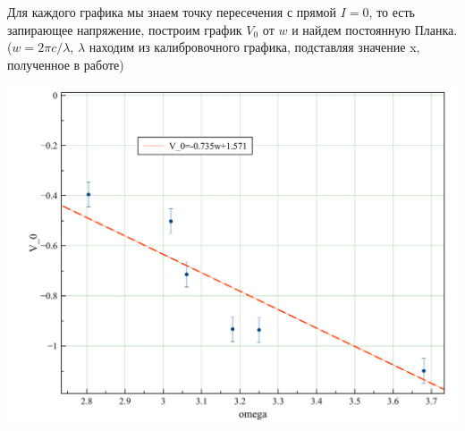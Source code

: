 \documentclass[a4paper,12pt]{article}
\begin{document}
			Для каждого графика мы знаем точку пересечения с прямой $I = 0$, то есть запирающее напряжение, построим график $V_0$ от $w$ и найдем постоянную Планка. ($w=2\pi c/\lambda$, $\lambda$ находим из калибровочного графика, подставляя значение x, полученное в работе)
			\begin{center}
				\includegraphics[width = 0.7\linewidth]{main}
			\end{center}
\end{document}
